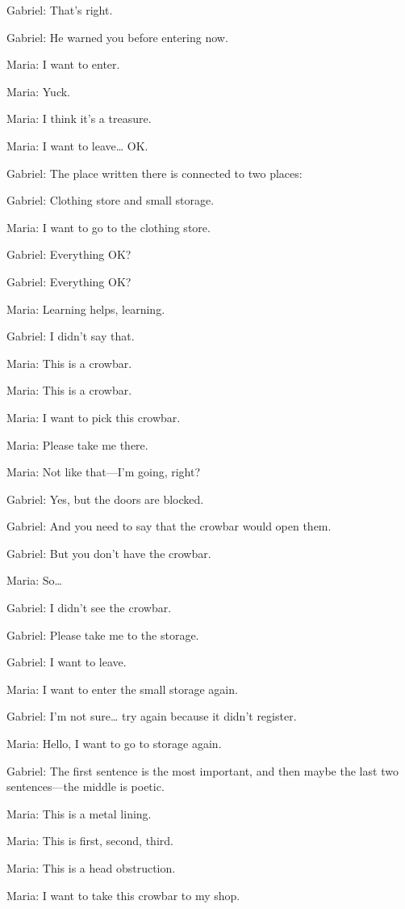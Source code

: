 Gabriel: That’s right.

Gabriel: He warned you before entering now.

Maria: I want to enter.

Maria: Yuck.

Maria: I think it’s a treasure.

Maria: I want to leave… OK.

Gabriel: The place written there is connected to two places:

Gabriel: Clothing store and small storage.

Maria: I want to go to the clothing store.

Gabriel: Everything OK?

Gabriel: Everything OK?

Maria: Learning helps, learning.

Gabriel: I didn’t say that.

Maria: This is a crowbar.

Maria: This is a crowbar.

Maria: I want to pick this crowbar.

Maria: Please take me there.

Maria: Not like that—I’m going, right?

Gabriel: Yes, but the doors are blocked.

Gabriel: And you need to say that the crowbar would open them.

Gabriel: But you don’t have the crowbar.

Maria: So…

Gabriel: I didn’t see the crowbar.

Gabriel: Please take me to the storage.

Gabriel: I want to leave.

Maria: I want to enter the small storage again.

Gabriel: I’m not sure… try again because it didn’t register.

Maria: Hello, I want to go to storage again.

Gabriel: The first sentence is the most important, and then maybe the last two sentences—the middle is poetic.

Maria: This is a metal lining.

Maria: This is first, second, third.

Maria: This is a head obstruction.

Maria: I want to take this crowbar to my shop.

